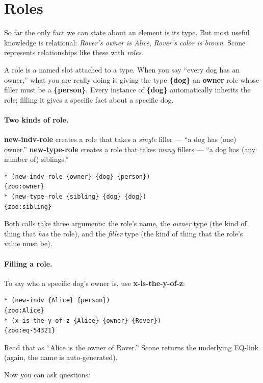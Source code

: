 \documentclass[titlepage,twoside,openright,11pt]{article}
\begin{document}
\section{Roles}\label{roles}

So far the only fact we can state about an element is its type. But
most useful knowledge is relational: \emph{Rover's owner is Alice},
\emph{Rover's color is brown}. Scone represents relationships like
these with \emph{roles}.

A role is a named slot attached to a type. When you say ``every dog
has an owner,'' what you are really doing is giving the type
\textbf{\{dog\}} an \textbf{owner} role whose filler must be a
\textbf{\{person\}}. Every instance of \textbf{\{dog\}}
automatically inherits the role; filling it gives a specific fact
about a specific dog.

\paragraph{Two kinds of role.}
\textbf{new-indv-role} creates a role that takes a \emph{single}
filler --- ``a dog has (one) owner.'' \textbf{new-type-role} creates
a role that takes \emph{many} fillers --- ``a dog has (any number
of) siblings.''

\begin{verbatim}
* (new-indv-role {owner} {dog} {person})
{zoo:owner}
* (new-type-role {sibling} {dog} {dog})
{zoo:sibling}
\end{verbatim}

Both calls take three arguments: the role's name, the \emph{owner}
type (the kind of thing that \emph{has} the role), and the
\emph{filler} type (the kind of thing that the role's value must
be).

\paragraph{Filling a role.}
To say who a specific dog's owner is, use \textbf{x-is-the-y-of-z}:

\begin{verbatim}
* (new-indv {Alice} {person})
{zoo:Alice}
* (x-is-the-y-of-z {Alice} {owner} {Rover})
{zoo:eq-54321}
\end{verbatim}

Read that as ``Alice is the owner of Rover.'' Scone returns the
underlying EQ-link (again, the name is auto-generated).

Now you can ask questions:
\end{document}
